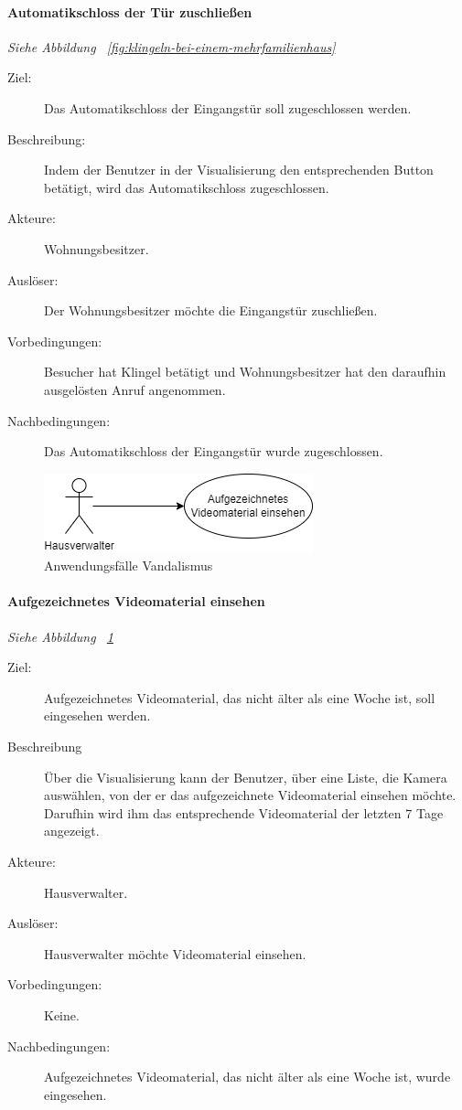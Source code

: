\paragraph{\large{Automatikschloss der Tür zuschließen}}
\textit{Siehe Abbildung ~\ref{fig:klingeln-bei-einem-mehrfamilienhaus}}
    \begin{description}
        \item[Ziel:] Das Automatikschloss der Eingangstür soll zugeschlossen werden.
        \item[Beschreibung:] Indem der Benutzer in der Visualisierung den entsprechenden Button betätigt, wird das Automatikschloss zugeschlossen.
        \item[Akteure:] Wohnungsbesitzer.
        \item[Auslöser:] Der Wohnungsbesitzer möchte die Eingangstür zuschließen.
        \item[Vorbedingungen:] Besucher hat Klingel betätigt und Wohnungsbesitzer hat den daraufhin ausgelösten Anruf angenommen.
        \item[Nachbedingungen:] Das Automatikschloss der Eingangstür wurde zugeschlossen.
    \end{description}


\begin{figure}[ht!]
    \centering
    \includegraphics[width=(\paperwidth-2in)/2]{../assets/img/UML-Anwendungsfalldiagramme-Vandalismus.drawio}
    \caption{Anwendungsfälle Vandalismus}
    \label{fig:vandalismus}
\end{figure}

\paragraph{\large{Aufgezeichnetes Videomaterial einsehen}}
\textit{Siehe Abbildung ~\ref{fig:vandalismus}}
    \begin{description}
        \item[Ziel:] Aufgezeichnetes Videomaterial, das nicht älter als eine Woche ist, soll eingesehen werden.
        \item[Beschreibung] Über die Visualisierung kann der Benutzer, über eine Liste, die Kamera auswählen, von der er das aufgezeichnete Videomaterial einsehen möchte.
            Darufhin wird ihm das entsprechende Videomaterial der letzten 7 Tage angezeigt.
        \item[Akteure:] Hausverwalter.
        \item[Auslöser:] Hausverwalter möchte Videomaterial einsehen.
        \item[Vorbedingungen:] Keine.
        \item[Nachbedingungen:] Aufgezeichnetes Videomaterial, das nicht älter als eine Woche ist, wurde eingesehen.
    \end{description}


